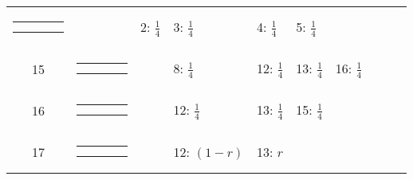 \begin{center}
\begin{tabular}{ccclllllll}
{\renewcommand{\tabcolsep}{0.5mm}
\parbox[b][3mm][c]{12mm}{
\begin{tabular}{|p{2mm}|p{2mm}||p{2mm}|p{2mm}|} \hline
$\bullet$ & $\bullet$ &           &           \\
          &           & $\bullet$ & $\circ  $ \\ \hline
\end{tabular}}}
&
& 2: $\frac{1}{4}$
& 3: $\frac{1}{4}$
& 4: $\frac{1}{4}$
& 5: $\frac{1}{4}$
& & & \\
15 &
{\renewcommand{\arraystretch}{0.3}
\renewcommand{\tabcolsep}{0.5mm}
\parbox[b][3mm][c]{12mm}{
\begin{tabular}{|p{2mm}|p{2mm}||p{2mm}|p{2mm}|} \hline
$\bullet$ &           &           &           \\
          &           & $\bullet$ & $\circ  $ \\ \hline
\end{tabular}}}
&
& 8: $\frac{1}{4}$
& 12: $\frac{1}{4}$
& 13: $\frac{1}{4}$
& 16: $\frac{1}{4}$
& & & \\
16 &
{\renewcommand{\arraystretch}{0.3}
\renewcommand{\tabcolsep}{0.5mm}
\parbox[b][3mm][c]{12mm}{
\begin{tabular}{|p{2mm}|p{2mm}||p{2mm}|p{2mm}|} \hline
$\bullet$ &           &           &           \\
          & $\bullet$ & $\circ  $ &           \\ \hline
\end{tabular}}}
&
& 12: $\frac{1}{4}$
& 13: $\frac{1}{4}$
& 15: $\frac{1}{4}$
& & & & \\
17 &
{\renewcommand{\arraystretch}{0.3}
\renewcommand{\tabcolsep}{0.5mm}
\parbox[b][3mm][c]{12mm}{
\begin{tabular}{|p{2mm}|p{2mm}||p{2mm}|p{2mm}|} \hline
$\bullet$ &           &           &           \\
$\circ  $ & $\bullet$ &           &           \\ \hline
\end{tabular}}}
&
& 12: $(1-r)$
& 13: $r$
& & & & & \\
\hline
\end{tabular}
\end{center}
